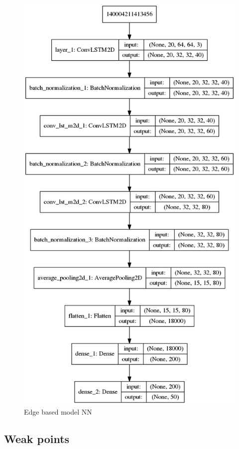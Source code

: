 \begin{figure}[h!]
    \centering
    \includegraphics[scale=0.4]{figures/model.png}
    \caption{Edge based model NN}
    \label{fig:nnModel}
\end{figure}

\subsection{Weak points}

